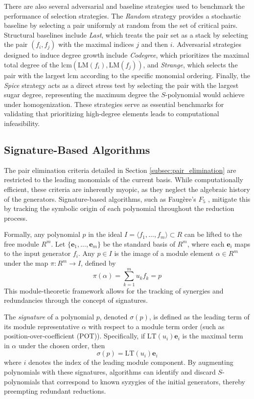 There are also several adversarial and baseline strategies used to benchmark the performance of selection strategies. The \textit{Random} strategy provides a stochastic baseline by selecting a pair uniformly at random from the set of critical pairs. Structural baselines include \textit{Last}, which treats the pair set as a stack by selecting the pair $(f_{i},f_{j})$ with the maximal indices $j$ and then $i$. Adversarial strategies designed to induce degree growth include \textit{Codegree}, which prioritizes the maximal total degree of the $\text{lcm}(\text{LM}(f_{i}),\text{LM}(f_{j}))$, and \textit{Strange}, which selects the pair with the largest $\text{lcm}$ according to the specific monomial ordering. Finally, the \textit{Spice} strategy acts as a direct stress test by selecting the pair with the largest sugar degree, representing the maximum degree the $S$-polynomial would achieve under homogenization. These strategies serve as essential benchmarks for validating that prioritizing high-degree elements leads to computational infeasibility.

\subsection{Signature-Based Algorithms}
\label{subsec:signature_based}

The pair elimination criteria detailed in Section \ref{subsec:pair_elimination} are restricted to the leading monomials of the current basis. While computationally efficient, these criteria are inherently myopic, as they neglect the algebraic history of the generators. Signature-based algorithms, such as Faugère's $F_{5}$ \cite{Faugere2002_F5}, mitigate this by tracking the symbolic origin of each polynomial throughout the reduction process.

Formally, any polynomial $p$ in the ideal $I=\langle f_{1},\dots ,f_{m}\rangle \subset R$ can be lifted to the free module $R^{m}$. Let $\{\mathbf{e}_{1},\dots ,\mathbf{e}_{m}\}$ be the standard basis of $R^{m}$, where each $\mathbf{e}_{i}$ maps to the input generator $f_{i}$. Any $p\in I$ is the image of a module element $\alpha \in R^{m}$ under the map $\pi :R^{m}\rightarrow I$, defined by 
$$\pi (\alpha )=\sum _{k=1}^{m}u_{k}f_{k}=p$$
This module-theoretic framework allows for the tracking of synergies and redundancies through the concept of signatures. 

The \textit{signature} of a polynomial $p$, denoted $\sigma (p)$, is defined as the leading term of its module representative $\alpha $ with respect to a module term order (such as position-over-coefficient (POT)). Specifically, if $\text{LT}(u_{i})\mathbf{e}_{i}$ is the maximal term in $\alpha $ under the chosen order, then
$$\sigma (p)=\text{LT}(u_{i})\mathbf{e}_{i}$$
where $i$ denotes the index of the leading module component. By augmenting polynomials with these signatures, algorithms can identify and discard $S$-polynomials that correspond to known syzygies of the initial generators, thereby preempting redundant reductions.


